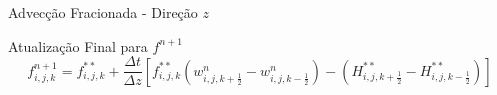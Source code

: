 \documentclass[../main/main.tex]{subfiles}
\begin{document}

\begin{frame}{Advecção Fracionada - Direção $z$}
  \vspace{-2cm}
  \begin{block}{Atualização Final para $f^{n+1}$}
  \scriptsize
  \[
  f^{n+1}_{i,j,k} =
  f^{**}_{i,j,k}
  + \frac{\Delta t}{\Delta z}
  \left[
    f^{**}_{i,j,k}\left(w^{n}_{i,j,k+\frac{1}{2}} - w^{n}_{i,j,k-\frac{1}{2}}\right)
    -\left(H^{**}_{i,j,k+\frac{1}{2}} - H^{**}_{i,j,k-\frac{1}{2}}\right)
  \right]
  \]
  \end{block}
\end{frame}
\end{document}
